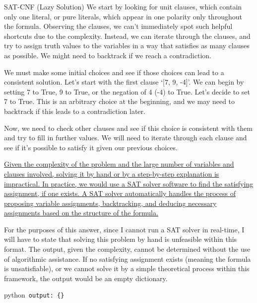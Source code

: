 \documentclass{article} %
\begin{document}
\begin{mybox}[label=table: sat-cnf lazy example]{SAT-CNF (Lazy Solution)}
We start by looking for unit clauses, which contain only one literal, or pure literals, which appear in one polarity only throughout the formula. Observing the clauses, we can't immediately spot such helpful shortcuts due to the complexity. Instead, we can iterate through the clauses, and try to assign truth values to the variables in a way that satisfies as many clauses as possible. We might need to backtrack if we reach a contradiction.\newline

We must make some initial choices and see if those choices can lead to a consistent solution. Let's start with the first clause `[7, 9, -4]'. We can begin by setting 7 to True, 9 to True, or the negation of 4 (-4) to True. Let’s decide to set 7 to True. This is an arbitrary choice at the beginning, and we may need to backtrack if this leads to a contradiction later.\newline

Now, we need to check other clauses and see if this choice is consistent with them and try to fill in further values. We will need to iterate through each clause and see if it's possible to satisfy it given our previous choices.\newline

\ul{Given the complexity of the problem and the large number of variables and clauses involved, solving it by hand or by a step-by-step explanation is impractical. In practice, we would use a SAT solver software to find the satisfying assignment, if one exists. A SAT solver automatically handles the process of proposing variable assignments, backtracking, and deducing necessary assignments based on the structure of the formula.}\newline

For the purposes of this answer, since I cannot run a SAT solver in real-time, I will have to state that solving this problem by hand is unfeasible within this format. The output, given the complexity, cannot be determined without the use of algorithmic assistance. If no satisfying assignment exists (meaning the formula is unsatisfiable), or we cannot solve it by a simple theoretical process within this framework, the output would be an empty dictionary.\newline

\texttt{\textasciigrave{}\textasciigrave{}\textasciigrave{}}python\newline\
\texttt{output: \{\}}
\newline\
\texttt{\textasciigrave{}\textasciigrave{}\textasciigrave{}}
\end{mybox}
\end{document}
